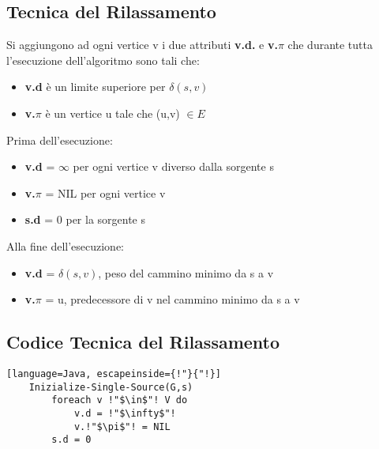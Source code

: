 \subsection{Tecnica del Rilassamento}
Si aggiungono ad ogni vertice v i due attributi \textbf{v.d.} e \textbf{v.$\pi$} che
durante tutta l'esecuzione dell'algoritmo sono tali che:
\begin{itemize}
    \item \textbf{v.d} è un limite superiore per \textbf{$\delta(s,v)$}
    \item \textbf{v.$\pi$} è un vertice u tale che (u,v) $\in E$
\end{itemize}
Prima dell'esecuzione:
\begin{itemize}
    \item \textbf{v.d} = $\infty$ per ogni vertice v diverso dalla sorgente s
    \item \textbf{v.$\pi$} = NIL per ogni vertice v
    \item \textbf{s.d} = 0 per la sorgente s
\end{itemize}
Alla fine dell'esecuzione:
\begin{itemize}
    \item \textbf{v.d} = \textbf{$\delta(s,v)$}, peso del cammino minimo da s a v
    \item \textbf{v.$\pi$} = u, predecessore di v nel cammino minimo da s a v
\end{itemize}
\subsection{Codice Tecnica del Rilassamento}
\begin{lstlisting}[language=Java, escapeinside={!"}{"!}]
    Inizialize-Single-Source(G,s)
        foreach v !"$\in$"! V do
            v.d = !"$\infty$"!
            v.!"$\pi$"! = NIL
        s.d = 0
\end{lstlisting}
